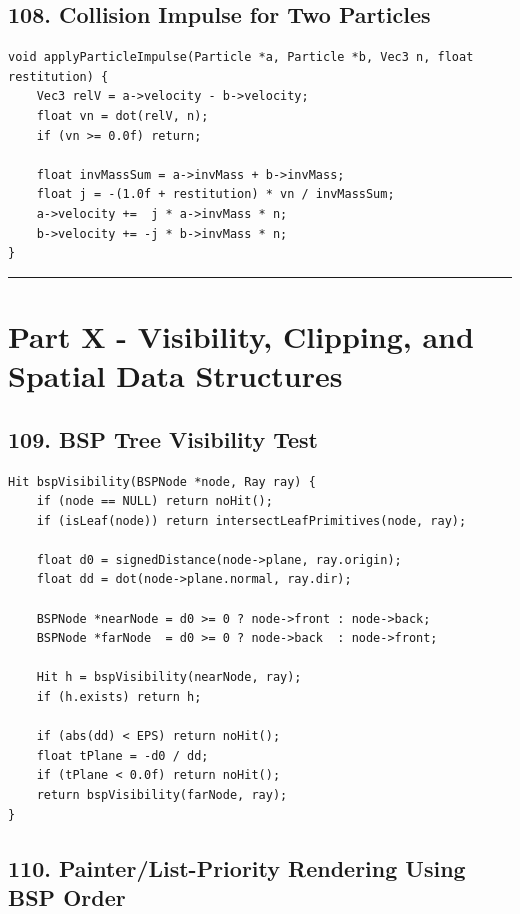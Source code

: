 \documentclass[10pt,letterpaper]{article}
\begin{document}
\subsection{108. Collision Impulse for Two Particles}

\begin{verbatim}
void applyParticleImpulse(Particle *a, Particle *b, Vec3 n, float restitution) {
    Vec3 relV = a->velocity - b->velocity;
    float vn = dot(relV, n);
    if (vn >= 0.0f) return;

    float invMassSum = a->invMass + b->invMass;
    float j = -(1.0f + restitution) * vn / invMassSum;
    a->velocity +=  j * a->invMass * n;
    b->velocity += -j * b->invMass * n;
}
\end{verbatim}

\medskip\hrule\medskip

\clearpage
\section{Part X - Visibility, Clipping, and Spatial Data Structures}

\subsection{109. BSP Tree Visibility Test}

\begin{verbatim}
Hit bspVisibility(BSPNode *node, Ray ray) {
    if (node == NULL) return noHit();
    if (isLeaf(node)) return intersectLeafPrimitives(node, ray);

    float d0 = signedDistance(node->plane, ray.origin);
    float dd = dot(node->plane.normal, ray.dir);

    BSPNode *nearNode = d0 >= 0 ? node->front : node->back;
    BSPNode *farNode  = d0 >= 0 ? node->back  : node->front;

    Hit h = bspVisibility(nearNode, ray);
    if (h.exists) return h;

    if (abs(dd) < EPS) return noHit();
    float tPlane = -d0 / dd;
    if (tPlane < 0.0f) return noHit();
    return bspVisibility(farNode, ray);
}
\end{verbatim}

\subsection{110. Painter/List-Priority Rendering Using BSP Order}
\end{document}
